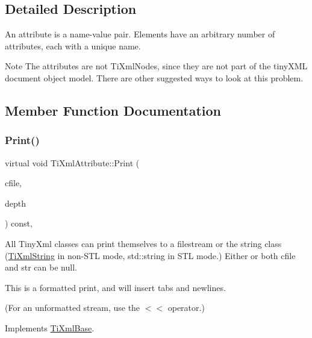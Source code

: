\subsection{Detailed Description}
An attribute is a name-\/value pair. Elements have an arbitrary number of attributes, each with a unique name.

\begin{DoxyNote}{Note}
The attributes are not Ti\+Xml\+Nodes, since they are not part of the tiny\+X\+ML document object model. There are other suggested ways to look at this problem. 
\end{DoxyNote}


\subsection{Member Function Documentation}
\mbox{\label{classTiXmlAttribute_a68ae373e03b9c35be4c9d0c3c233b894}} 
\subsubsection{\texorpdfstring{Print()}{Print()}}
{\footnotesize\ttfamily virtual void Ti\+Xml\+Attribute\+::\+Print (\begin{DoxyParamCaption}\item[{F\+I\+LE $\ast$}]{cfile,  }\item[{int}]{depth }\end{DoxyParamCaption}) const\hspace{0.3cm}{\ttfamily [inline]}, {\ttfamily [virtual]}}

All Tiny\+Xml classes can print themselves to a filestream or the string class (\hyperlink{classTiXmlString}{Ti\+Xml\+String} in non-\/\+S\+TL mode, std\+::string in S\+TL mode.) Either or both cfile and str can be null.

This is a formatted print, and will insert tabs and newlines.

(For an unformatted stream, use the $<$$<$ operator.) 

Implements \hyperlink{classTiXmlBase_a0de56b3f2ef14c65091a3b916437b512}{Ti\+Xml\+Base}.

\mbox{\label{classTiXmlAttribute_a6caa8090d2fbb7966700a16e45ed33de}} 
